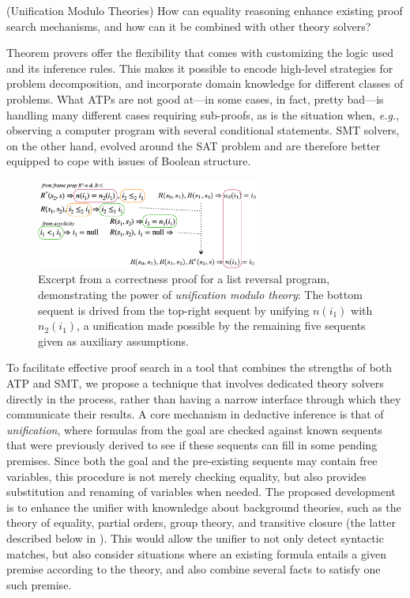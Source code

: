 \begin{researchquestion}(Unification Modulo Theories) How can equality reasoning enhance existing proof search mechanisms, and how can it be combined with other theory solvers?
\end{researchquestion}

Theorem provers offer the flexibility that comes with customizing the logic used and its inference rules.
This makes it possible to encode high-level strategies for problem decomposition, and incorporate domain knowledge for different classes of problems.
What ATPs are not good at---in some cases, in fact, pretty bad---is
handling many different cases requiring sub-proofs,
as is the situation when, \emph{e.g.}, observing a computer program with several conditional statements.
SMT solvers, on the other hand, evolved around the SAT problem and are therefore better equipped to cope with issues of Boolean structure.

\begin{figure}
\centering
\includegraphics[width=0.65\textwidth]{img/unification-modulo-theories.pdf}
\caption{Excerpt from a correctness proof for a list reversal program, demonstrating the power of \emph{unification modulo theory}:
The bottom sequent is drived from the top-right sequent by unifying $n(i_1)$ with $n_2(i_1)$, a unification made possible by the remaining five sequents given as auxiliary assumptions.}
\label{unification:example}
\end{figure}

To facilitate effective proof search in a tool that combines the strengths of both ATP and SMT,
we propose a technique that involves dedicated theory solvers directly in the process, rather than having a narrow interface through which they communicate their results.
A core mechanism in deductive inference is that of \emph{unification}, where formulas from the goal are checked against known sequents that were previously derived to see if these sequents can fill in some pending premises.
Since both the goal and the pre-existing sequents may contain free variables, this procedure is not merely checking equality, but also provides substitution and renaming of variables when needed.
The proposed development is to enhance the unifier with knownledge about background theories, such as the theory of equality, partial orders, group theory, and transitive closure (the latter described below in \todo{}).
This would allow the unifier to not only detect syntactic matches, but also consider situations where an existing formula entails a given premise according to the theory,
and also combine several facts to satisfy one such premise.

